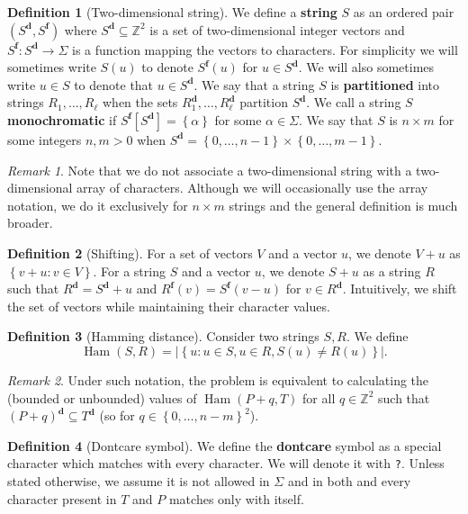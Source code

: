 \documentclass[11pt]{article}
\DeclareMathOperator*{\Ham}{Ham}
\newcommand{\Z}{\mathbb{Z}}
\newcommand{\set}[1]{\left\lbrace #1 \right\rbrace}
\theoremstyle{plain}
\theoremstyle{definition}
\newtheorem{definition}{Definition}
\theoremstyle{remark}
\newtheorem*{remark}{Remark}
\begin{document}
\renewcommand{\d}[1]{#1^\mathbf{d}}
\newcommand{\f}[1]{#1^\mathbf{f}}
\begin{definition}[Two-dimensional string]
	We define a \textbf{string} $S$ as an ordered pair $(\d{S}, \f{S})$ where $\d{S} \subseteq \Z^2$ is a set of two-dimensional integer vectors and $\f{S} : \d{S} \to \Sigma$
	is a function mapping the vectors to characters.
	For simplicity we will sometimes write $S(u)$ to denote $\f{S}(u)$ for $u \in \d{S}$.
	We will also sometimes write $u \in S$ to denote that $u \in \d{S}$.
	We say that a string $S$ is \textbf{partitioned} into strings $R_1, \dots, R_\ell$ when the sets $\d{R_1}, \dots, \d{R_\ell}$ partition $\d{S}$.
	We call a string $S$ \textbf{monochromatic} if $\f{S}[\d{S}] = \set{\alpha}$ for some $\alpha \in \Sigma$.
	We say that $S$ is $n \times m$ for some integers $n, m > 0$ when $\d{S} = \set{0, \dots, n - 1} \times \set{0, \dots, m - 1}$.
\end{definition}


\begin{remark}
	Note that we do not associate a two-dimensional string with a two-dimensional array of characters.
	Although we will occasionally use the array notation, we do it exclusively for $n \times m$ strings and the general definition is much broader.
\end{remark}


\begin{definition}[Shifting]
	For a set of vectors $V$ and a vector $u$, we denote $V + u$ as $\set{v + u : v \in V}$.
	For a string $S$ and a vector $u$, we denote $S + u$ as a string $R$ such that
	$\d{R} = \d{S} + u$ and $\f{R}(v) = \f{S}(v - u)$ for $v \in \d{R}$.
	Intuitively, we shift the set of vectors while maintaining their character values.
\end{definition}


\begin{definition}[Hamming distance]
	Consider two strings $S, R$. We define
	$$ \Ham(S, R) = |\set{u : u \in S, u \in R, S(u) \neq R(u)}|.$$
\end{definition}


\begin{remark}
	Under such notation, the \HD problem is equivalent to calculating the (bounded or unbounded) values of $ \Ham(P + q, T) $
	for all $q \in \Z^2$ such that $\d{(P + q)} \subseteq \d{T}$ (so for $q \in \set{0, \dots, n - m}^2$).
\end{remark}


\begin{definition}[Dontcare symbol]
	We define the \textbf{dontcare} symbol as a special character which matches with every character.
	We will denote it with \texttt{?}.
	Unless stated otherwise, we assume it is not allowed in $\Sigma$ and in both \hd and \HD every character present in $T$ and $P$ matches only with itself.
\end{definition}
\end{document}
